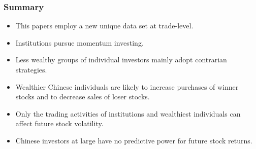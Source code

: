 \documentclass{beamer}
\begin{document}
\begin{frame}
    \frametitle{Summary}
    \begin{itemize}
        \item This papers employ a new unique data set at trade-level.
        \item Institutions pursue momentum investing.
        \item Less wealthy groups of individual investors mainly adopt contrarian strategies.
        \item Wealthier Chinese individuals are likely to increase purchases of winner stocks and to decrease sales of loser stocks.
        \item Only the trading activities of institutions and wealthiest individuals can aﬀect future stock volatility.
        \item Chinese investors at large have no predictive power for future stock returns.
    \end{itemize}
\end{frame}
\end{document}
